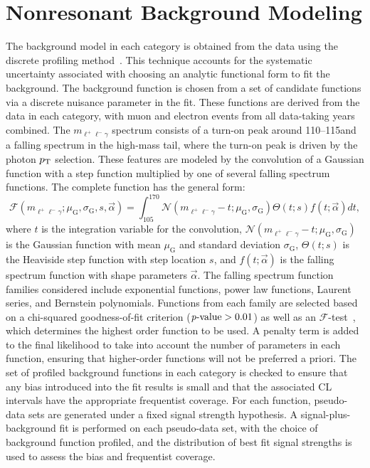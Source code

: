 \section{Nonresonant Background Modeling}
The background model in each category is obtained from the data using the discrete profiling method~\cite{Dauncey:2014xga}.
This technique accounts for the systematic uncertainty associated with choosing an analytic functional form to fit the background.
The background function is chosen from a set of candidate functions via a discrete nuisance parameter in the fit.
These functions are derived from the data in each category, with muon and electron events from all data-taking years combined.
The $m_{\ell^+\ell^-\gamma}$ spectrum consists of a turn-on peak around 110--115\GeV and a falling spectrum in the high-mass tail, where the turn-on peak is driven by the photon $p_{\mathrm{T}}$ selection.
These features are modeled by the convolution of a Gaussian function with a step function multiplied by one of several falling spectrum functions.
The complete function has the general form:
\begin{equation}
    \mathcal{F}(m_{\ell^+\ell^-\gamma}; \mu_{\mathrm{G}}, \sigma_{\mathrm{G}}, s, \vec{\alpha}) = \int_{105}^{170}\mathcal{N}(m_{\ell^+\ell^-\gamma}-t;\mu_{\mathrm{G}},\sigma_{\mathrm{G}})\Theta(t; s)f(t; \vec{\alpha})dt,
\end{equation}
where $t$ is the integration variable for the convolution, $\mathcal{N}(m_{\ell^+\ell^-\gamma}-t;\mu_{\mathrm{G}},\sigma_{\mathrm{G}})$ is the Gaussian function with mean $\mu_{\mathrm{G}}$ and standard deviation $\sigma_{\mathrm{G}}$, $\Theta(t; s)$ is the Heaviside step function with step location $s$, and $f(t; \vec{\alpha})$ is the falling spectrum function with shape parameters $\vec{\alpha}$.
The falling spectrum function families considered include exponential functions, power law functions, Laurent series, and Bernstein polynomials.
Functions from each family are selected based on a chi-squared goodness-of-fit criterion ($\text{\textit{p}-value} > 0.01$) as well as an $\mathcal{F}$-test~\cite{Fisher:1922saa}, which determines the highest order function to be used.
A penalty term is added to the final likelihood to take into account the number of parameters in each function, ensuring that higher-order functions will not be preferred a priori.
The set of profiled background functions in each category is checked to ensure that any bias introduced into the fit results is small and that the associated CL intervals have the appropriate frequentist coverage. For each function, pseudo-data sets are generated under a fixed signal strength hypothesis. A signal-plus-background fit is performed on each pseudo-data set, with the choice of background function profiled, and the distribution of best fit signal strengths is used to assess the bias and frequentist coverage.


